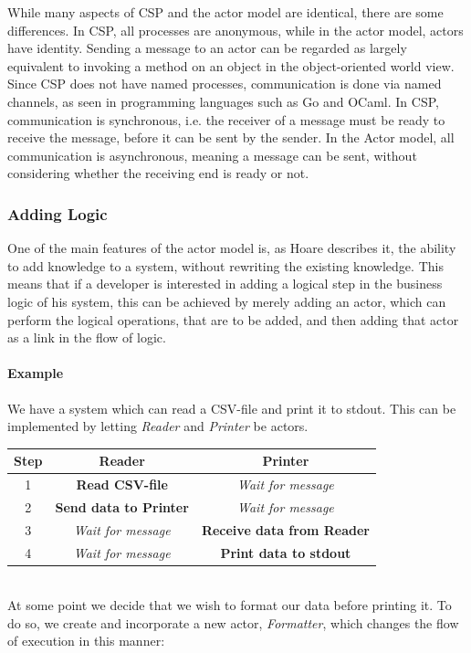 While many aspects of CSP and the actor model are identical, there are some differences. In CSP, all processes are anonymous, while in the actor model, actors have identity. Sending a message to an actor can be regarded as largely equivalent to invoking a method on an object in the object-oriented world view. Since CSP does not have named processes, communication is done via named channels, as seen in programming languages such as Go and OCaml. 
In CSP, communication is synchronous, i.e. the receiver of a message must be ready to receive the message, before it can be sent by the sender. In the Actor model, all communication is asynchronous, meaning a message can be sent, without considering whether the receiving end is ready or not.

\subsubsection{Adding Logic}
One of the main features of the actor model is, as Hoare describes it, the ability to add knowledge to a system, without rewriting the existing knowledge. This means that if a developer is interested in adding a logical step in the business logic of his system, this can be achieved by merely adding an actor, which can perform the logical operations, that are to be added, and then adding that actor as a link in the flow of logic.

\paragraph{Example}
We have a system which can read a CSV-file and print it to stdout. This can be implemented by letting \emph{Reader} and \emph{Printer} be actors.

\begin{tabular}{ | c | c | c | }
\hline
Step & Reader & Printer \\\hline
1 & \textbf{Read CSV-file} & \textit{Wait for message} \\\hline
2 & \textbf{Send data to Printer} & \textit{Wait for message}\\\hline
3 & \textit{Wait for message} & \textbf{Receive data from Reader}\\\hline
4 & \textit{Wait for message} & \textbf{Print data to stdout}\\\hline
\end{tabular}\\
At some point we decide that we wish to format our data before printing it. To do so, we create and incorporate a new actor, \emph{Formatter}, which changes the flow of execution in this manner:\\

